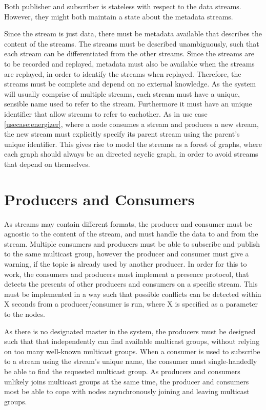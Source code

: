 Both publisher and subscriber is stateless with respect to the data streams. However, they might both maintain a state about the metadata streams.

Since the stream is just data, there must be metadata available that describes the content of the streams. The streams must be described unambiguously, such that each stream can be differentiated from the other streams. Since the streams are to be recorded and replayed, metadata must also be available when the streams are replayed, in order to identify the streams when replayed. Therefore, the streams must be complete and depend on no external knowledge.
As the system will usually comprise of multiple streams, each stream must have a unique, sensible name used to refer to the stream. Furthermore it must have an unique identifier that allow streams to refer to eachother.
As in use case \ref{usecase:energizer}, where a node consumes a stream and produces a new stream, the new stream must explicitly specify its parent stream using the parent's unique identifier. This gives rise to model the streams as a forest of graphs, where each graph should always be an directed acyclic graph, in order to avoid streams that depend on themselves.


\section{Producers and Consumers}
As streams may contain different formats, the producer and consumer must be agnostic to the content of the stream, and must handle the data to and from the stream.
Multiple consumers and producers must be able to subscribe and publish to the same multicast group, however the producer and consumer must give a warning, if the topic is already used by another producer. In order for this to work, the consumers and producers must implement a presence protocol, that detects the presents of other producers and consumers on a specific stream. This must be implemented in a way such that possible conflicts can be detected within X seconds from a producer/consumer is run, where X is specified as a parameter to the nodes.

As there is no designated master in the system, the producers must be designed such that that independently can find available multicast groups, without relying on too many well-known multicast groups. When a consumer is used to subscribe to a stream using the stream's unique name, the consumer must single-handedly be able to find the requested multicast group.
As producers and consumers unlikely joins multicast groups at the same time, the producer and consumers most be able to cope with nodes asynchronously joining and leaving multicast groups.

